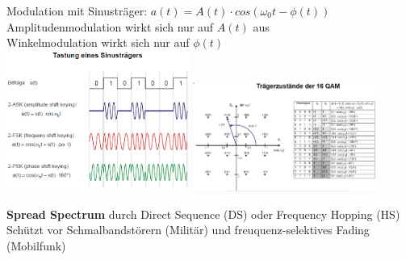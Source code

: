 \documentclass[fs, footer]{latex4ei}
\begin{document}
\begin{multicols*}{4}
{	Modulation mit Sinusträger: $a(t) = A(t)\cdot cos(\omega_0 t - \phi(t))$
	Amplitudenmodulation wirkt sich nur auf $A(t)$ aus \\
	Winkelmodulation wirkt sich nur auf $\phi(t)$ \\
	
	\includegraphics[width = 6cm]{./img/2-ASK_2-FSK_2-PSK.png}
	\includegraphics[width = 6cm]{./img/QAM_Sender2.png}
	
	\textbf{Spread Spectrum} durch Direct Sequence (DS) oder Frequency Hopping (HS) \\
	Schützt vor Schmalbandstörern (Militär) und freuquenz-selektives Fading (Mobilfunk) \\
	
	
}





\sectionbox{
}
\end{multicols*}
\end{document}
